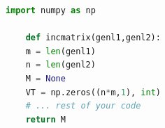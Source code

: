\documentclass{article}
\begin{document}
	

\begin{lstlisting}[language=Python]
	import numpy as np
	
	def incmatrix(genl1,genl2):
	m = len(genl1)
	n = len(genl2)
	M = None
	VT = np.zeros((n*m,1), int)
	# ... rest of your code
	return M
\end{lstlisting}
\end{document}
